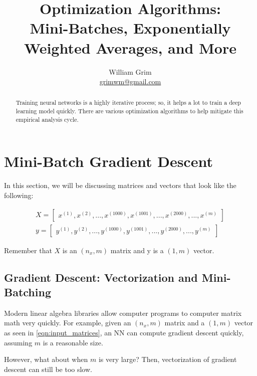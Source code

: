 \documentclass{article}
\begin{document}
\title {Optimization Algorithms:\\
Mini-Batches, Exponentially Weighted Averages, and More}
\author{William Grim \\ \href{mailto:grimwm@gmail.com}{grimwm@gmail.com}}

\maketitle

\tableofcontents

\begin{abstract}
Training neural networks is a highly iterative process; so, it helps a lot to train a deep learning model quickly.  There are various optimization algorithms to help mitigate this empirical analysis cycle.
\end{abstract}

\section{Mini-Batch Gradient Descent}

In this section, we will be discussing matrices and vectors that look like the following:

\begin{gather}
\label{eqn:input_matrices}
X = \begin{bmatrix}
x^{(1)}, x^{(2)}, ..., x^{(1000)}, x^{(1001)}, ..., x^{(2000)}, ..., x^{(m)}
\end{bmatrix}\\
%
y = \begin{bmatrix}
y^{(1)}, y^{(2)}, ..., y^{(1000)}, y^{(1001)}, ..., y^{(2000)}, ..., y^{(m)}
\end{bmatrix}
\end{gather}

Remember that $X$ is an $(n_x, m)$ matrix and y is a $(1, m)$ vector.

\subsection{Gradient Descent: Vectorization and Mini-Batching}

Modern linear algebra libraries allow computer programs to computer matrix math very quickly.  For example, given an $(n_x, m)$ matrix and a $(1, m)$ vector as seen in \ref{eqn:input_matrices}, an NN can compute gradient descent quickly, assuming $m$ is a reasonable size.

However, what about when $m$ is very large?  Then, vectorization of gradient descent can still be too slow.
\end{document}
